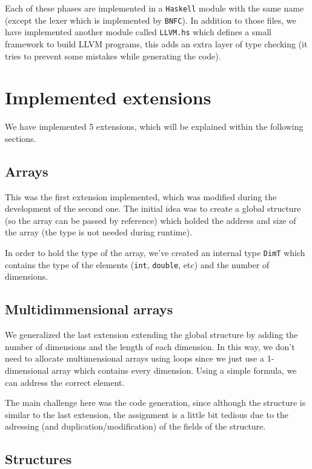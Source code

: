 \documentclass{article}
\begin{document}
Each of these phases are implemented in a \texttt{Haskell} module with the same name (except the lexer which is implemented by \texttt{BNFC}). In addition to those files, we have implemented another module called \texttt{LLVM.hs} which defines a small framework to build LLVM programs, this adds an extra layer of type checking (it tries to prevent some mistakes while generating the code).

\section{Implemented extensions}

We have implemented 5 extensions, which will be explained within the following sections.

\subsection{Arrays}

This was the first extension implemented, which was modified during the development of the second one. The initial idea was to create a global structure (so the array can be passed by reference) which holded the address and size of the array (the type is not needed during runtime).

In order to hold the type of the array, we've created an internal type \texttt{DimT} which contains the type of the elements (\texttt{int}, \texttt{double}, etc) and the number of dimensions. 

\subsection{Multidimmensional arrays}


We generalized the last extension extending the global structure by adding the number of dimensions and the length of each dimension. In this way, we don't need to allocate multimensional arrays using loops since we just use a 1-dimensional array which contains every dimension. Using a simple formula, we can address the correct element.

    The main challenge here was the code generation, since although the structure is similar to the last extension, the assignment is a little bit tedious due to the adressing (and duplication/modification) of the fields of the structure. 
\subsection{Structures}
\end{document}
